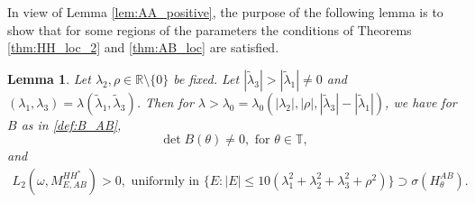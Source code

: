 \documentclass[11pt]{amsart}
\newtheorem{lemma}[theorem]{Lemma}
\newcommand{\R}{\mathbb R}
\newcommand{\T}{\mathbb T}
\begin{document}
In view of Lemma \ref{lem:AA_positive}, the purpose of the following lemma is to show that for some regions of the parameters the conditions of Theorems \ref{thm:HH_loc_2} and \ref{thm:AB_loc} are satisfied.
\begin{lemma}\label{lem:AB_positive}
Let $\lambda_2,\rho\in \R\setminus\{0\}$ be fixed. Let $|\tilde{\lambda}_3|>|\tilde{\lambda}_1|\neq 0$ and $(\lambda_1,\lambda_3)=\lambda(\tilde{\lambda}_1,\tilde{\lambda}_3)$. Then for $\lambda>\lambda_0=\lambda_0(|\lambda_2|,|\rho|,|\tilde{\lambda}_3|-|\tilde{\lambda}_1|)$, we have for $B$ as in \eqref{def:B_AB},
    \[\det B(\theta)\neq 0, \text{ for } \theta\in \T,\]
    and
    \begin{align}\label{eq:L_2>0_AB}
        L_2(\omega,M_{E,AB}^{HH^*})>0, \text{ uniformly in } \{E: |E|\leq 10(\lambda_1^2+\lambda_2^2+\lambda_3^2+\rho^2)\}\supset\sigma(H^{AB}_{\theta}).
    \end{align}
\end{lemma}
\end{document}
